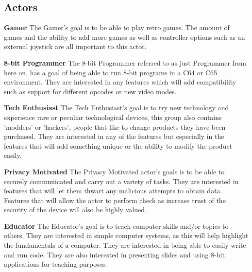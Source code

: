 \subsection{Actors}
\textbf{Gamer}
The Gamer's goal is to be able to play retro games. The amount of games and the ability to add more games as well as controller options such as an external joystick are all important to this actor.

\textbf{8-bit Programmer}
The 8-bit Programmer referred to as just Programmer from here on, has a goal of being able to run 8-bit programs in a C64 or C65 environment. They are interested in any features which will add compatibility such as support for different opcodes or new video modes. 

\textbf{Tech Enthusiast}
The Tech Enthusiast's goal is to try new technology and experience rare or peculiar technological devices, this group also contains 'modders' or 'hackers', people that like to change products they have been purchased. They are interested in any of the features but especially in the features that will add something unique or the ability to modify the product easily.

\textbf{Privacy Motivated}
The Privacy Motivated actor's goals is to be able to securely communicated and carry out a variety of tasks. They are interested in features that will let them thwart any malicious attempts to obtain data. Features that will allow the actor to perform check as increase trust of the security of the device will also be highly valued. 

\textbf{Educator}
The Educator's goal is to teach computer skills and/or topics to others. They are interested in simple computer systems, as this will help highlight the fundamentals of a computer. They are interested in being able to easily write and run code. They are also interested in presenting slides and using 8-bit applications for teaching purposes.

